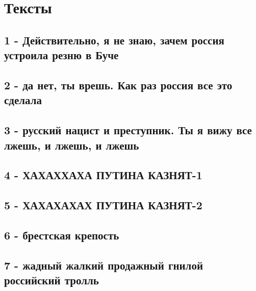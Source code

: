  
 
 
 
 

\section{Тексты}

\subsection{1 - Действительно, я не знаю, зачем россия устроила резню в Буче}

\subsection{2 - да нет, ты врешь. Как раз россия все это сделала}

\subsection{3 - русский нацист и преступник. Ты я вижу все лжешь, и лжешь, и лжешь}

\subsection{4 - ХАХАХХАХА ПУТИНА КАЗНЯТ-1}

\subsection{5 - ХАХАХАХАХ ПУТИНА КАЗНЯТ-2}

\subsection{6 - брестская крепость}

\subsection{7 - жадный жалкий продажный гнилой российский тролль}

